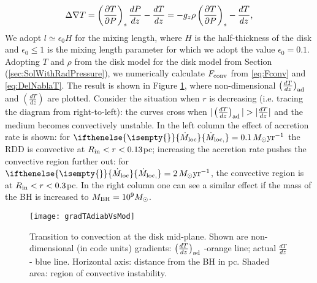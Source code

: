 \documentclass[12pt,english,preprint]{aastex}
\newcommand{\su}[2]{#1_{\rm #2}}
\newcommand{\mdt}[1][]{ 
  \ifthenelse{\isempty{#1}}
  {\dot{M}_{\rm loc}}
  { {\dot M}_{\rm{loc},{#1}} } 
  } %
\newcommand{\Rin}{\su{R}{in}}
\newcommand{\MsolYrM}{ \,M_{\odot}{\rm yr}^{-1} }
\begin{document}
\begin{equation}
\Delta\nabla T=\left(\frac{\partial T}{\partial P}\right)_{s}\frac{dP}{dz}-\frac{dT}{dz}=-g_{z}\rho\left(\frac{\partial T}{\partial P}\right)_{s}-\frac{dT}{dz}\mbox{,}\label{eq:DelNablaT}
\end{equation}
We adopt $l\simeq\epsilon_{0}H$ for the mixing length, where
$H$ is the half-thickness of the disk and $\epsilon_{0}\leq1$ is
the mixing length parameter for which we adopt the value $\epsilon_{0}=0.1$.
Adopting  $T$ and $\rho$ from the disk model for the disk model from Section (\ref{sec:SolWithRadPressure}), we numerically 
calculate $\su{F}{conv}$ from \eqref{eq:Fconv} and \eqref{eq:DelNablaT}.
The result is shown in Figure \ref{fig:ConvRegion}, where non-dimensional
$\su{\left(\frac{dT}{dz}\right)}{ad}$ and $\left(\frac{dT}{dz}\right)$ are plotted. Consider the situation when $r$ is decreasing
(i.e. tracing the diagram from right-to-left): the curves cross when $\vert\su{\left(\frac{dT}{dz}\right)}{ad}\vert>\vert\frac{dT}{dz}\vert$ and 
the medium becomes convectively unstable. 
In the left column the effect of accretion rate is shown: for $\mdt=0.1\MsolYrM$ the RDD is convective at $\Rin<r<0.13$pc;
increasing the accretion rate pushes the convective region further out: for $\mdt=2\MsolYrM$, the convective region is at $\Rin<r<0.3$pc.
In the right column one can see a similar effect if the mass of the BH is increased to $\su{M}{BH}=10^9M_\odot$.

\begin{figure}\label{fig:ConvRegion}
\texttt{[image: gradTAdiabVsMod]} \caption{Transition to convection at the disk mid-plane. Shown are non-dimensional
(in code units) gradients: $\left(\frac{dT}{dz}\right)_{{\rm ad}}$
-orange line; actual $\frac{dT}{dz}$ - blue line. Horizontal axis:
distance from the BH in pc. Shaded area: region of convective instability.}
\end{figure}







\end{document}
